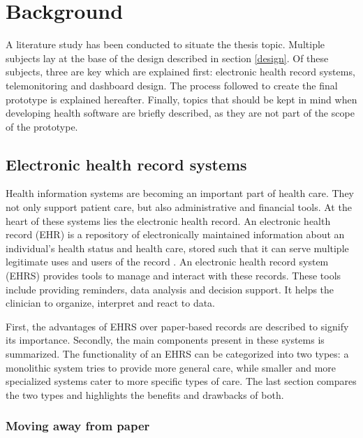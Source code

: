 \section{Background} \label{background}

A literature study has been conducted to situate the thesis topic. Multiple subjects lay at the base of the design described in section \ref{design}. Of these subjects, three are key which are explained first: electronic health record systems, telemonitoring and dashboard design. The process followed to create the final prototype is explained hereafter. Finally, topics that should be kept in mind when developing health software are briefly described, as they are not part of the scope of the prototype.

    \subsection{Electronic health record systems}

    Health information systems are becoming an important part of health care. They not only support patient care, but also administrative and financial tools. At the heart of these systems lies the electronic health record. An electronic health record (EHR) is a repository of electronically maintained information about an individual's health status and health care, stored such that it can serve multiple legitimate uses and users of the record \cite{biomedical_informatics}. An electronic health record system (EHRS) provides tools to manage and interact with these records. These tools include providing reminders, data analysis and decision support. It helps the clinician to organize, interpret and react to data.

    First, the advantages of EHRS over paper-based records are described to signify its importance. Secondly, the main components present in these systems is summarized. The functionality of an EHRS can be categorized into two types: a monolithic system tries to provide more general care, while smaller and more specialized systems cater to more specific types of care. The last section compares the two types and highlights the benefits and drawbacks of both.

        \subsubsection{Moving away from paper} \label{2_ehrs_paper}

